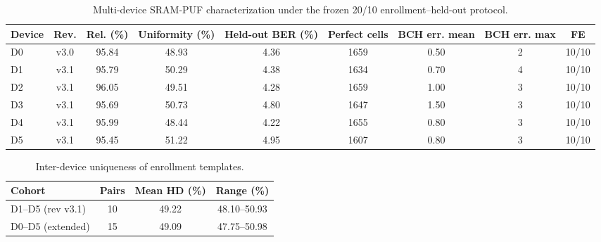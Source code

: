\begin{table}[t]
\centering
\caption{Multi-device SRAM-PUF characterization under the frozen 20/10 enrollment--held-out protocol.}
\label{tab:multidevice_puf}
\begin{tabular}{lcccccccc}
\hline
Device & Rev. & Rel. (\%) & Uniformity (\%) & Held-out BER (\%) & Perfect cells & BCH err. mean & BCH err. max & FE \\
\hline
D0 & v3.0 & 95.84 & 48.93 & 4.36 & 1659 & 0.50 & 2 & 10/10 \\
D1 & v3.1 & 95.79 & 50.29 & 4.38 & 1634 & 0.70 & 4 & 10/10 \\
D2 & v3.1 & 96.05 & 49.51 & 4.28 & 1659 & 1.00 & 3 & 10/10 \\
D3 & v3.1 & 95.69 & 50.73 & 4.80 & 1647 & 1.50 & 3 & 10/10 \\
D4 & v3.1 & 95.99 & 48.44 & 4.22 & 1655 & 0.80 & 3 & 10/10 \\
D5 & v3.1 & 95.45 & 51.22 & 4.95 & 1607 & 0.80 & 3 & 10/10 \\
\hline
\end{tabular}
\end{table}

\begin{table}[t]
\centering
\caption{Inter-device uniqueness of enrollment templates.}
\label{tab:puf_uniqueness}
\begin{tabular}{lccc}
\hline
Cohort & Pairs & Mean HD (\%) & Range (\%) \\
\hline
D1--D5 (rev v3.1) & 10 & 49.22 & 48.10--50.93 \\
D0--D5 (extended) & 15 & 49.09 & 47.75--50.98 \\
\hline
\end{tabular}
\end{table}
